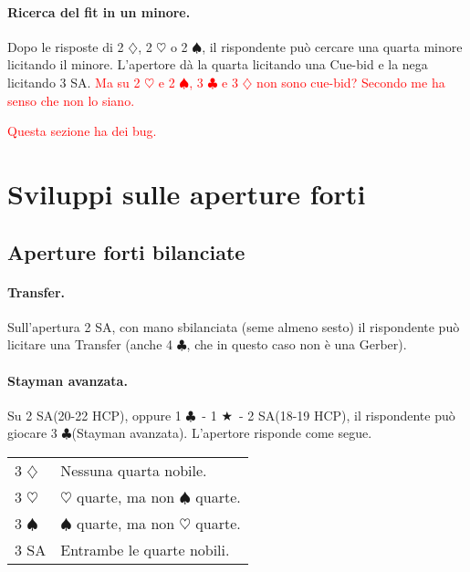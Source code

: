 \documentclass[a4paper,10pt]{article}
\renewcommand{\c}{$\clubsuit$\xspace}
\renewcommand{\d}{$\diamondsuit$\xspace}
\newcommand{\h}{$\heartsuit$\xspace}
\newcommand{\s}{$\spadesuit$\xspace}
\renewcommand{\j}{$\bigstar$\xspace}
\newcommand{\sa}{SA\xspace}
\newcommand{\smallspace}{\vskip0.3cm}
\newcommand{\note}[1]{\textcolor{red}{#1}}
\newenvironment{twocol}
  {\smallspace\noindent\begin{tabular}{l p{0.78\textwidth}}}
  {\end{tabular}\smallspace}
\begin{document}
\paragraph{Ricerca del fit in un minore.}
Dopo le risposte di 2 \d, 2 \h o 2 \s, il rispondente può cercare una quarta minore licitando il minore. L'apertore dà la quarta licitando una Cue-bid e la nega licitando 3 \sa.
\note{Ma su 2 \h e 2 \s, 3 \c e 3 \d non sono cue-bid? Secondo me ha senso che non lo siano.}

\note{Questa sezione ha dei bug.}

\pagebreak

\section{Sviluppi sulle aperture forti}


\subsection{Aperture forti bilanciate}

\paragraph{Transfer.} Sull'apertura 2 \sa, con mano sbilanciata (seme almeno sesto) il rispondente può licitare una Transfer (anche 4 \c, che in questo caso non è una Gerber).

\paragraph{Stayman avanzata.} Su 2 \sa (20-22 HCP), oppure 1 \c\ - 1 \j\ - 2 \sa (18-19 HCP), il rispondente può giocare 3 \c (Stayman avanzata). L'apertore risponde come segue.
\begin{twocol}
	3 \d & Nessuna quarta nobile.\\
	3 \h & \h quarte, ma non \s quarte.\\
	3 \s & \s quarte, ma non \h quarte.\\
	3 \sa & Entrambe le quarte nobili.\\
\end{twocol}
\end{document}

